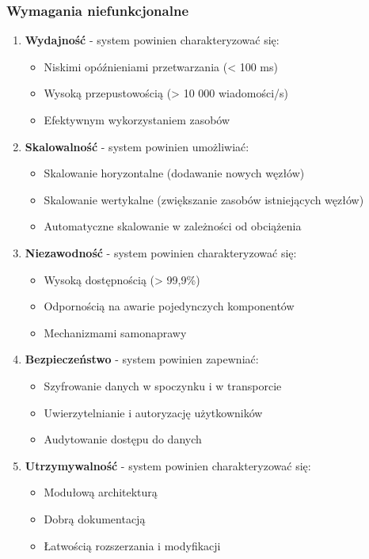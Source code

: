 \subsubsection{Wymagania niefunkcjonalne}
\label{subsubsec:wymagania_niefunkcjonalne}

\begin{enumerate}
    \item \textbf{Wydajność} - system powinien charakteryzować się:
    \begin{itemize}
        \item Niskimi opóźnieniami przetwarzania (< 100 ms)
        \item Wysoką przepustowością (> 10 000 wiadomości/s)
        \item Efektywnym wykorzystaniem zasobów
    \end{itemize}
    
    \item \textbf{Skalowalność} - system powinien umożliwiać:
    \begin{itemize}
        \item Skalowanie horyzontalne (dodawanie nowych węzłów)
        \item Skalowanie wertykalne (zwiększanie zasobów istniejących węzłów)
        \item Automatyczne skalowanie w zależności od obciążenia
    \end{itemize}
    
    \item \textbf{Niezawodność} - system powinien charakteryzować się:
    \begin{itemize}
        \item Wysoką dostępnością (> 99,9\%)
        \item Odpornością na awarie pojedynczych komponentów
        \item Mechanizmami samonaprawy
    \end{itemize}
    
    \item \textbf{Bezpieczeństwo} - system powinien zapewniać:
    \begin{itemize}
        \item Szyfrowanie danych w spoczynku i w transporcie
        \item Uwierzytelnianie i autoryzację użytkowników
        \item Audytowanie dostępu do danych
    \end{itemize}
    
    \item \textbf{Utrzymywalność} - system powinien charakteryzować się:
    \begin{itemize}
        \item Modułową architekturą
        \item Dobrą dokumentacją
        \item Łatwością rozszerzania i modyfikacji
    \end{itemize}
\end{enumerate}

